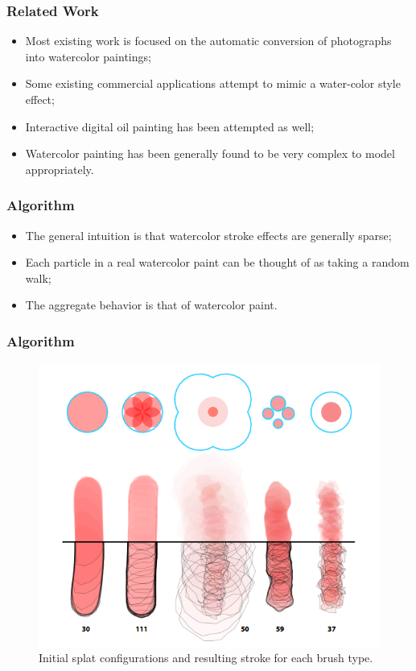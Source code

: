 \documentclass{beamer}
\begin{document}
\begin{frame}
    \frametitle{Related Work}
    \begin{itemize}
        \item Most existing work is focused on the automatic conversion of
        photographs into watercolor paintings;
        \item Some existing commercial applications attempt to mimic a
        water-color style effect;
        \item Interactive digital oil painting has been attempted as well;
        \item Watercolor painting has been generally found to be very complex
        to model appropriately.
    \end{itemize}
\end{frame}

\begin{frame}
    \frametitle{Algorithm}
    \begin{itemize}
        \item The general intuition is that watercolor stroke effects are
        generally sparse;
        \item Each particle in a real watercolor paint can be thought of as
        taking a random walk;
        \item The aggregate behavior is that of watercolor paint.
    \end{itemize}
\end{frame}

\begin{frame}
    \frametitle{Algorithm}
    \begin{figure}
        \centering
        \includegraphics[width=0.6\paperwidth]{f2.png}
        \caption{\footnotesize{Initial splat configurations and resulting
        stroke for each brush type.}}
    \end{figure}
\end{frame}
\end{document}

